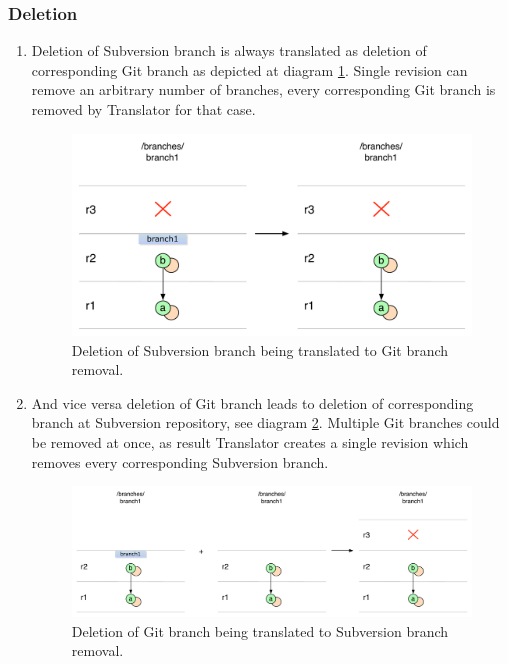 \subsubsection{Deletion}

\begin{enumerate}
\compactlist
\item Deletion of Subversion branch is always translated as deletion of corresponding Git branch as depicted at diagram \ref{branch_deletion_svn_to_git}. Single revision can remove an arbitrary number of branches, every corresponding Git branch is removed by Translator for that case.
\begin{figure}[!h]
\centering
\renewcommand{\figurename}{Diagram}
\includegraphics[width=\linewidth]{img/diagrams/branch_deletion_svn_to_git.pdf}
\caption{Deletion of Subversion branch being translated to Git branch removal.}
\label{branch_deletion_svn_to_git}
\end{figure}

\item And vice versa deletion of Git branch leads to deletion of corresponding branch at Subversion repository, see diagram \ref{branch_deletion_git_to_svn}. Multiple Git branches could be removed at once, as result Translator creates a single revision which removes every corresponding Subversion branch.
\begin{figure}[!h]
\centering
\renewcommand{\figurename}{Diagram}
\includegraphics[width=\linewidth]{img/diagrams/branch_deletion_git_to_svn.pdf}
\caption{Deletion of Git branch being translated to Subversion branch removal.}
\label{branch_deletion_git_to_svn}
\end{figure}
\end{enumerate}


